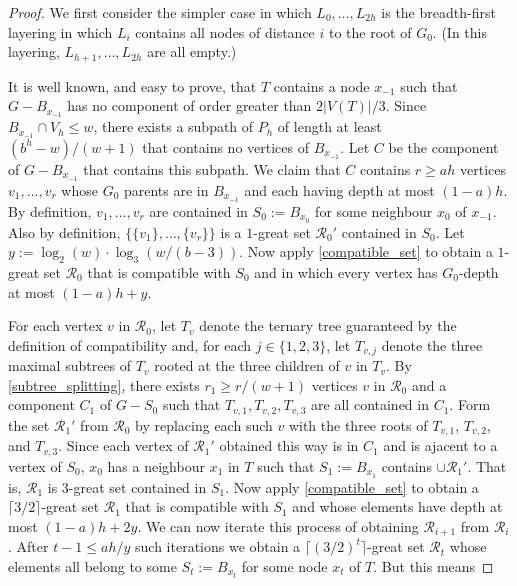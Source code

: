 \documentclass{patmorin}
\begin{document}
\begin{proof}
  We first consider the simpler case in which $L_0,\ldots,L_{2h}$ is the breadth-first layering in which $L_i$ contains all nodes of distance $i$ to the root of $G_0$.  (In this layering, $L_{h+1},\ldots,L_{2h}$ are all empty.)

  It is well known, and easy to prove, that $T$ contains a node $x_{-1}$ such that $G-B_{x_{-1}}$ has no component of order greater than $2|V(T)|/3$.
  Since $B_{x_{-1}}\cap V_h \le w$, there exists a subpath of $P_h$ of length at least $(b^h-w)/(w+1)$ that contains no vertices of $B_{x_{-1}}$.  Let $C$ be the component of $G-B_{x_{-1}}$ that contains this subpath.  We claim that $C$ contains $r\ge ah$ vertices $v_1,\ldots,v_r$ whose $G_0$ parents are in $B_{x_{-1}}$ and each having depth at most $(1-a)h$.  By definition, $v_1,\ldots,v_r$ are contained in $S_0:=B_{x_0}$ for some neighbour $x_0$ of $x_{-1}$.  Also by definition, $\{\{v_1\},\ldots,\{v_r\}\}$ is a $1$-great set $\mathcal{R}_0'$ contained in $S_0$.  Let $y:=\log_2(w)\cdot\log_3(w/(b-3))$.  Now apply \cref{compatible_set} to obtain a $1$-great set $\mathcal{R}_0$ that is compatible with $S_0$ and in which every vertex has $G_0$-depth at most $(1-a)h+y$.  

  For each vertex $v$ in $\mathcal{R}_0$, let $T_v$ denote the ternary tree guaranteed by the definition of compatibility and, for each $j\in\{1,2,3\}$, let $T_{v,j}$ denote the three maximal subtrees of $T_v$ rooted at the three children of $v$ in $T_v$.  By \cref{subtree_splitting}, there exists $r_1\ge r/(w+1)$ vertices $v$ in $\mathcal{R}_0$ and a component $C_1$ of $G-S_0$ such that $T_{v,1},T_{v,2},T_{v,3}$ are all contained in $C_1$.  Form the set $\mathcal{R}_1'$ from $\mathcal{R}_0$ by replacing each such $v$ with the three roots of $T_{v,1}$, $T_{v,2}$, and $T_{v,3}$.  Since each vertex of $\mathcal{R}_1'$ obtained this way is in $C_1$ and is ajacent to a vertex of $S_0$, $x_0$ has a neighbour $x_1$ in $T$ such that $S_1:=B_{x_1}$ contains $\cup\mathcal{R}_1'$.  That is, $\mathcal{R}_1$ is $3$-great set contained in $S_1$.  Now apply \cref{compatible_set} to obtain a $\lceil 3/2\rceil$-great set $\mathcal{R}_1$ that is compatible with $S_1$ and whose elements have depth at most $(1-a)h+2y$.  We can now iterate this process of obtaining $\mathcal{R}_{i+1}$ from $\mathcal{R}_i$.  After $t-1\le ah/y$ such iterations we obtain a $\lceil(3/2)^t\rceil$-great set $\mathcal{R}_t$ whose elements all belong to some $S_t:=B_{x_{t}}$ for some node $x_t$ of $T$.  But this means  
\end{proof}
\end{document}
